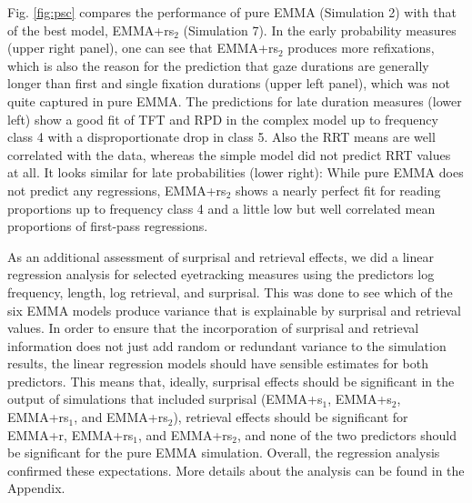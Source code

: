 Fig. \ref{fig:psc} compares the performance of pure EMMA (Simulation 2) with that of the best model, EMMA+rs$_2$ (Simulation 7).  In the early probability measures (upper right panel), one can see that EMMA+rs$_2$ produces more refixations, which is also the reason for the prediction that gaze durations are generally longer than first and single fixation durations (upper left panel), which was not quite captured in pure EMMA.  The predictions for late duration measures (lower left) show a good fit of TFT and RPD in the complex model up to frequency class 4 with a disproportionate drop in class 5.  Also the RRT means are well correlated with the data, whereas the simple model did not predict RRT values at all.  It looks similar for late probabilities (lower right): While pure EMMA does not predict any regressions, EMMA+rs$_2$ shows a nearly perfect fit for reading proportions up to frequency class 4 and a little low but well correlated mean proportions of first-pass regressions.

As an additional assessment of surprisal and retrieval effects, we did a linear regression analysis for selected eyetracking measures using the predictors log frequency, length, log retrieval, and surprisal.  This was done to see which of the six EMMA models produce variance that is explainable by surprisal and retrieval values.  In order to ensure that the incorporation of surprisal and retrieval information does not just add random or redundant variance to the simulation results, the linear regression models should have sensible estimates for both predictors.  This means that, ideally, surprisal effects should be significant in the output of simulations that included surprisal (EMMA+s$_1$, EMMA+s$_2$, EMMA+rs$_1$, and EMMA+rs$_2$), retrieval effects should be significant for EMMA+r, EMMA+rs$_1$, and EMMA+rs$_2$, and none of the two predictors should be significant for the pure EMMA simulation.  
Overall, the regression analysis confirmed these expectations.  More details about the analysis can be found in the Appendix. 

